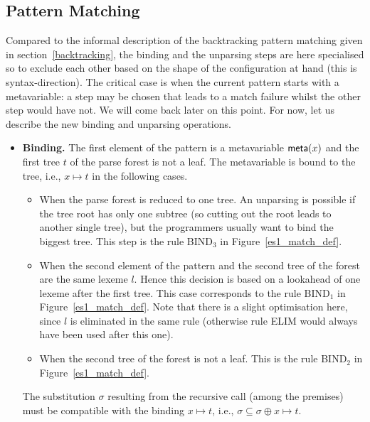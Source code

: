 \subsection{Pattern Matching}

Compared to the informal description of the backtracking pattern
matching given in section~\ref{backtracking}, the binding and the
unparsing steps are here specialised so to exclude each other based on
the shape of the configuration at hand (this is
syntax\hyp{}direction). The critical case is when the current pattern
starts with a meta\-variable: a step may be chosen that leads to a
match failure whilst the other step would have not. We will come back
later on this point. For now, let us describe the new binding and
unparsing operations.
\begin{itemize}

  \item \textbf{Binding.} The first element of the pattern is a
    meta\-variable \(\textsf{meta}(x)\) and the first tree \(t\) of the parse
    forest is not a leaf. The meta\-variable is bound to the tree,
    i.e., \(x \mapsto t\) in the following cases.
    \begin{itemize}

      \item When the parse forest is reduced to one tree. An unparsing
      is possible if the tree root has only one subtree (so cutting
      out the root leads to another single tree), but the programmers
      usually want to bind the biggest tree. This step is the rule
      \textsf{BIND}\(_3\) in Figure~\ref{es1_match_def}.

      \item When the second element of the pattern and the second tree
      of the forest are the same lexeme \(l\). Hence this decision is
      based on a lookahead of one lexeme after the first tree. This
      case corresponds to the rule \textsf{BIND}\(_1\) in
      Figure~\ref{es1_match_def}. Note that there is a slight
      optimisation here, since \(l\) is eliminated in the same rule
      (otherwise rule \textsf{ELIM} would always have been used after
      this one).

      \item When the second tree of the forest is not a leaf. This is
      the rule \textsf{BIND}\(_2\) in Figure~\ref{es1_match_def}.

    \end{itemize}
    The substitution \(\sigma\) resulting from the recursive call
    (among the premises) must be compatible with the binding \(x
    \mapsto t\), i.e., \(\sigma \subseteq \sigma \oplus x \mapsto t\).


\end{itemize}
